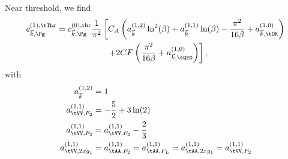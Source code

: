 Near threshold, we find
\begin{align}
c_{\vec k,\Pg}^{(1),\tThr} &= c_{\vec k,\Pg}^{(0),\text{thr}} \frac{1}{\pi^2}\left[
     C_A\left(a_{\vec k}^{(1,2)}\ln^2(\beta) + a_{\vec k}^{(1,1)}\ln(\beta) - \frac{\pi^2}{16\beta} + a_{\vec k,\tOK}^{(1,0)}\right) \right. \nonumber\\
 &\hspace{60pt} \left. + 2CF\left(\frac{\pi^2}{16\beta} + a_{\vec k,\tQED}^{(1,0)}\right)\right],
\end{align}
with
\begin{align}
a^{(1,2)}_{\vec k} &= 1\\
a^{(1,1)}_{\tVV,F_2} &= -\frac 5 2 + 3\ln(2)\\
a^{(1,1)}_{\tVV,F_2} &= a^{(1,1)}_{\tVV,F_2} - \frac 2 3\\
a^{(1,1)}_{\tVV,2xg_1} &= a^{(1,1)}_{\tAA,F_2} = a^{(1,1)}_{\tAA,F_L} = a^{(1,1)}_{\tAA,2xg_1}= a^{(1,1)}_{\tVV,F_2}
\end{align}

